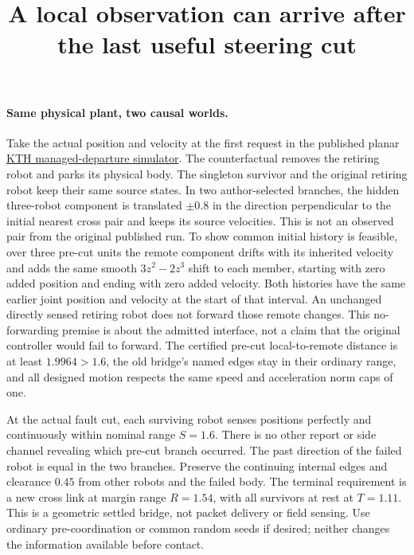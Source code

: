 \documentclass{article}
\title{A local observation can arrive after the last useful steering cut}
\date{}
\begin{document}
\maketitle

\paragraph{Same physical plant, two causal worlds.}
Take the actual position and velocity at the first request in the
published planar \href{https://arxiv.org/html/2609.29939v1}{KTH
managed-departure simulator}. The counterfactual removes the retiring
robot and parks its physical body. The singleton survivor and the
original retiring robot keep their same source states. In two
author-selected branches, the hidden three-robot component is
translated $\pm0.8$ in the direction perpendicular to the initial
nearest cross pair and keeps its source velocities. This is not
an observed pair from the original published run. To show common
initial history is feasible, over three pre-cut units the remote
component drifts with its inherited velocity and adds the same
smooth $3z^2-2z^3$ shift to each member, starting with zero added
position and ending with zero added velocity. Both histories have
the same earlier joint position and velocity at the start of that
interval. An unchanged directly sensed retiring robot does not
forward those remote changes. This no-forwarding premise is about
the admitted interface, not a claim that the original controller
would fail to forward. The certified pre-cut local-to-remote
distance is at least $1.9964>1.6$, the old bridge's named edges
stay in their ordinary range, and all designed motion respects
the same speed and acceleration norm caps of one.

At the actual fault cut, each surviving robot senses positions
perfectly and continuously within nominal range $S=1.6$. There is
no other report or side channel revealing which pre-cut branch
occurred. The past direction of the failed robot is equal in the
two branches. Preserve the continuing internal edges and
clearance $0.45$ from other robots and the failed body. The
terminal requirement is a new cross link at margin range
$R=1.54$, with all survivors at rest at $T=1.11$. This is a
geometric settled bridge, not packet delivery or field sensing.
Use ordinary pre-coordination or common random seeds if desired;
neither changes the information available before contact.
\end{document}
